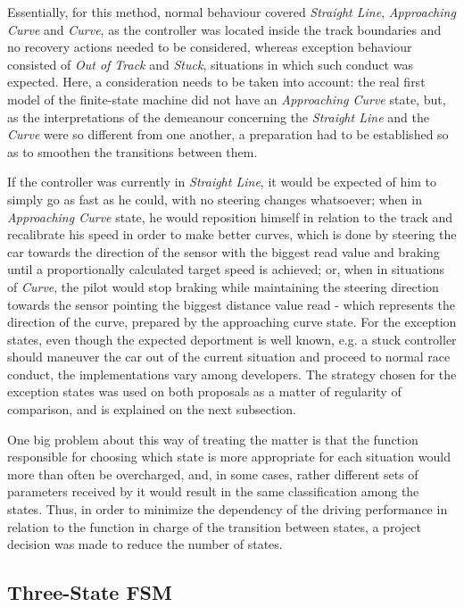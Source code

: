 	Essentially, for this method, normal behaviour covered \emph{Straight Line}, \emph{Approaching Curve} and
	\emph{Curve}, as the controller was located inside the track boundaries and no recovery actions needed to be
	considered, whereas exception behaviour consisted of \emph{Out of Track} and \emph{Stuck}, situations in which
	such conduct was expected. Here, a consideration needs to be taken into account: the real first model of the
	finite-state machine did not have an \emph{Approaching Curve} state, but, as the interpretations of the demeanour
	concerning the \emph{Straight Line} and the \emph{Curve} were so different from one another, a preparation had to
	be established so as to smoothen the transitions between them.
	
	If the controller was currently in \emph{Straight Line}, it would be expected of him to simply go as fast as he
	could, with no steering changes whatsoever; when in \emph{Approaching Curve} state, he would reposition himself
	in relation to the track and recalibrate his speed in order to make better curves, which is done by steering the
	car towards the direction of the sensor with the biggest read value and braking until a proportionally calculated
	target speed is achieved; or, when in situations of \emph{Curve}, the pilot would stop braking while maintaining
	the steering direction towards the sensor pointing the biggest distance value read - which represents the
	direction of the curve, prepared by the approaching curve state. For the exception states, even though the
	expected deportment is well known, e.g. a stuck controller should maneuver the car out of the current situation
	and proceed to normal race conduct, the implementations vary among developers. The strategy chosen for the
	exception states was used on both proposals as a matter of regularity of comparison, and is explained on the next
	subsection.
	
	One big problem about this way of treating the matter is that the function responsible for choosing which state
	is more appropriate for each situation would more than often be overcharged, and, in some cases, rather different
	sets of parameters received by it would result in the same classification among the states. Thus, in order to
	minimize the dependency of the driving performance in relation to the function in charge of the transition
	between states, a project decision was made to reduce the number of states.
		
\subsection{Three-State FSM} \label{subsec:FSM3}
	
